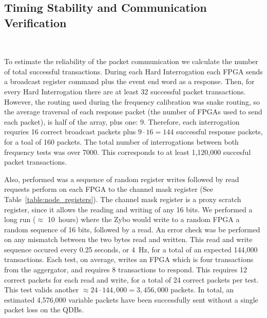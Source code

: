 




\subsection{Timing Stability and Communication Verification}~\label{sec:timing_test_results}

To estimate the reliability of the packet communication we calculate the number of total successful transactions.
During each Hard Interrogation each FPGA sends a broadcast register command plus the event end word as a response.
Then, for every Hard Interrogation there are at least 32 successful packet transactions. 
However, the routing used during the frequency calibration was snake routing, so the average traversal of each response packet (the number of FPGAs used to send each packet), is half of the array, plus one: 9.
Therefore, each interrogation requries 16 correct broadcast packets plus $9\cdot 16 = 144$ successful response packets, for a toal of 160 packets.
The total number of interrogations between both frequency tests was over 7000.
This corresponds to at least 1,120,000 succesful packet transactions.

Also, performed was a sequence of random register writes followed by read requests perform on each FPGA to the channel mask register (See Table~\ref{table:node_registers}).
The channel mask register is a proxy scratch register, since it allows the reading and writing of any 16 bits.
We performed a long run ($\approx$ 10~\unit{hours}) where the Zybo would write to a random FPGA a random sequence of 16 bits, followed by a read.
An error check was be performed on any mismatch between the two bytes read and written.
This read and write sequence occured every 0.25 seconds, or 4~\unit{Hz}, for a total of an expected 144,000 transactions.
Each test, on average, writes an FPGA which is four transactions from the aggergator, and requires 8 transactions to respond.
This requires 12 correct packets for each read and write, for a total of 24 correct packets per test.
This test valids another $\approx 24\cdot 144,000 = 3,456,000$ packets.
In total, an estimated 4,576,000 variable packets have been successfully sent without a single packet loss on the QDBs.

